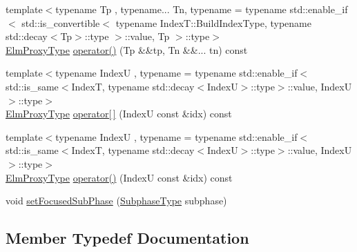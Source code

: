 \begin{DoxyCompactItemize}
\item 
{\footnotesize template$<$typename Tp , typename... Tn, typename  = typename std\+::enable\+\_\+if$<$      std\+::is\+\_\+convertible$<$        typename Index\+T\+::\+Build\+Index\+Type, typename std\+::decay$<$\+Tp$>$\+::type      $>$\+::value, Tp    $>$\+::type$>$ }\\\hyperlink{structvt_1_1vrt_1_1collection_1_1_collection_proxy_a892c21eae1dca37321d7973f72b55b0a}{Elm\+Proxy\+Type} \hyperlink{structvt_1_1vrt_1_1collection_1_1_collection_proxy_a8a06bed8946060c4d1e11f665e05e64f}{operator()} (Tp \&\&tp, Tn \&\&... tn) const
\item 
{\footnotesize template$<$typename IndexU , typename  = typename std\+::enable\+\_\+if$<$      std\+::is\+\_\+same$<$\+Index\+T, typename std\+::decay$<$\+Index\+U$>$\+::type$>$\+::value, Index\+U    $>$\+::type$>$ }\\\hyperlink{structvt_1_1vrt_1_1collection_1_1_collection_proxy_a892c21eae1dca37321d7973f72b55b0a}{Elm\+Proxy\+Type} \hyperlink{structvt_1_1vrt_1_1collection_1_1_collection_proxy_a81f027fb0c7d2b55ec06a2f91dd8d72e}{operator\mbox{[}$\,$\mbox{]}} (IndexU const \&idx) const
\item 
{\footnotesize template$<$typename IndexU , typename  = typename std\+::enable\+\_\+if$<$      std\+::is\+\_\+same$<$\+Index\+T, typename std\+::decay$<$\+Index\+U$>$\+::type$>$\+::value, Index\+U    $>$\+::type$>$ }\\\hyperlink{structvt_1_1vrt_1_1collection_1_1_collection_proxy_a892c21eae1dca37321d7973f72b55b0a}{Elm\+Proxy\+Type} \hyperlink{structvt_1_1vrt_1_1collection_1_1_collection_proxy_a53d97b9ca0294b4254556620463708d9}{operator()} (IndexU const \&idx) const
\item 
void \hyperlink{structvt_1_1vrt_1_1collection_1_1_collection_proxy_a3b39db2b0516118989cd6647f61bc9fd}{set\+Focused\+Sub\+Phase} (\hyperlink{namespacevt_ae78cbfdf1e57470e33eedb074f2beeba}{Subphase\+Type} subphase)
\end{DoxyCompactItemize}


\subsection{Member Typedef Documentation}
\mbox{\label{structvt_1_1vrt_1_1collection_1_1_collection_proxy_a892c21eae1dca37321d7973f72b55b0a}} 
